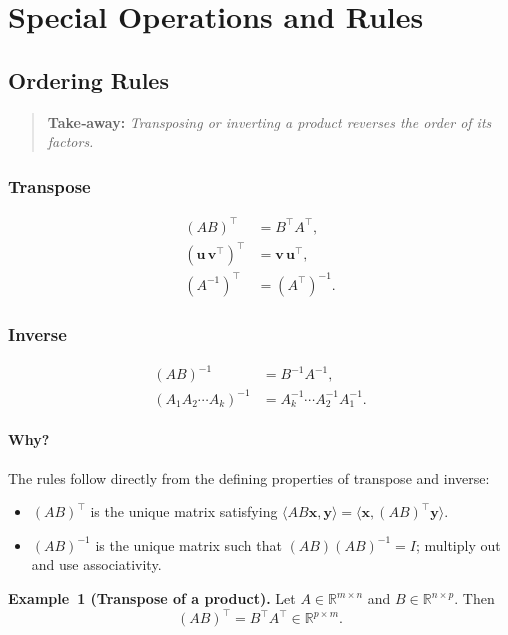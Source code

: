 \section{Special Operations and Rules}

\subsection{Ordering Rules}
\begin{quote}
\textbf{Take‑away:} \emph{Transposing or inverting a product reverses the order of its factors.}
\end{quote}

\subsubsection*{Transpose}
\begin{align}
(AB)^\top &= B^\top A^\top,\\[4pt]
(\mathbf u\,\mathbf v^\top)^\top &= \mathbf v\,\mathbf u^\top,\\[4pt]
(A^{-1})^\top &= (A^\top)^{-1}.
\end{align}

\subsubsection*{Inverse}
\begin{align}
(AB)^{-1} &= B^{-1} A^{-1},\\[4pt]
(A_1A_2\cdots A_k)^{-1} &= A_k^{-1}\cdots A_2^{-1}A_1^{-1}.
\end{align}

\paragraph{Why?} The rules follow directly from the defining properties of transpose and inverse:
\begin{itemize}
  \item $(AB)^\top$ is the unique matrix satisfying $\langle AB\mathbf x,\mathbf y\rangle=\langle \mathbf x,(AB)^\top\mathbf y\rangle$.
  \item $(AB)^{-1}$ is the unique matrix such that $(AB)(AB)^{-1}=I$; multiply out and use associativity.
\end{itemize}

\noindent\textbf{Example 1 (Transpose of a product).} Let $A\in\mathbb R^{m\times n}$ and $B\in\mathbb R^{n\times p}$. Then
$$(AB)^\top=B^\top A^\top\in\mathbb R^{p\times m}.$$

